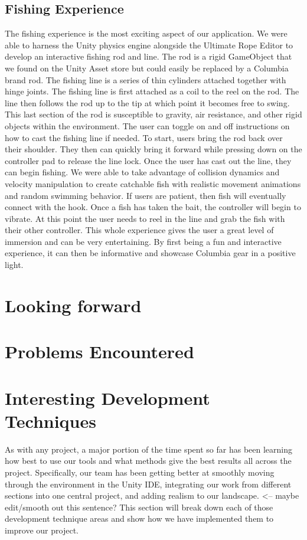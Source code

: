 \documentclass[10pt,journal,compsoc,onecolumn, draftclsnofoot]{IEEEtran}
\begin{document}
\subsection{Fishing Experience}
The fishing experience is the most exciting aspect of our application. We were able to harness the Unity physics engine alongside the Ultimate Rope Editor to develop an interactive fishing rod and line. The rod is a rigid GameObject that we found on the Unity Asset store but could easily be replaced by a Columbia brand rod. The fishing line is a series of thin cylinders attached together with hinge joints. The fishing line is first attached as a coil to the reel on the rod. The line then follows the rod up to the tip at which point it becomes free to swing. This last section of the rod is susceptible to gravity, air resistance, and other rigid objects within the environment. The user can toggle on and off instructions on how to cast the fishing line if needed. To start, users bring the rod back over their shoulder. They then can quickly bring it forward while pressing down on the controller pad to release the line lock. Once the user has cast out the line, they can begin fishing. We were able to take advantage of collision dynamics and velocity manipulation to create catchable fish with realistic movement animations and random swimming behavior. If users are patient, then fish will eventually connect with the hook. Once a fish has taken the bait, the controller will begin to vibrate. At this point the user needs to reel in the line and grab the fish with their other controller. This whole experience gives the user a great level of immersion and can be very entertaining. By first being a fun and interactive experience, it can then be informative and showcase Columbia gear in a positive light.



\section{Looking forward}



\section{Problems Encountered}



\section{Interesting Development Techniques}
As with any project, a major portion of the time spent so far has been learning how best to use our tools and what methods give the best results all across the project.
Specifically, our team has been getting better at smoothly moving through the environment in the Unity IDE, integrating our work from different sections into one central project, and adding realism to our landscape.  <-- maybe edit/smooth out this sentence?
This section will break down each of those development technique areas and show how we have implemented them to improve our project.
\end{document}
